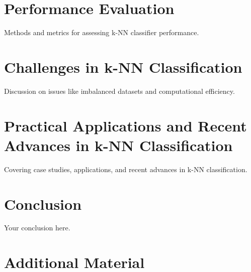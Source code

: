 \documentclass[report,10pt]{article}
\begin{document}
\section{Performance Evaluation}
Methods and metrics for assessing k-NN classifier performance.
\newpage

\section{Challenges in k-NN Classification}
Discussion on issues like imbalanced datasets and computational efficiency.
\newpage

\section{Practical Applications and Recent Advances in k-NN Classification}
Covering case studies, applications, and recent advances in k-NN classification.
\newpage

\section{Conclusion}
Your conclusion here.
\newpage


\newpage

\appendix
\section{Additional Material}
\end{document}
